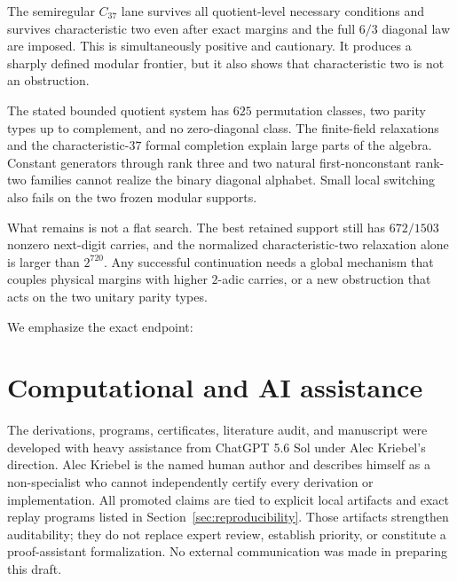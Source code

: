 \documentclass[11pt]{article}
\theoremstyle{definition}
\begin{document}
The semiregular \(C_{37}\) lane survives all quotient-level necessary
conditions and survives characteristic two even after exact margins and
the full \(6/3\) diagonal law are imposed.  This is simultaneously
positive and cautionary.  It produces a sharply defined modular frontier,
but it also shows that characteristic two is not an obstruction.

The stated bounded quotient system has \(625\) permutation classes, two
parity types up to complement, and no zero-diagonal class.  The finite-field
relaxations and the characteristic-\(37\) formal completion explain large
parts of the algebra.  Constant generators through rank three and two
natural first-nonconstant rank-two families cannot realize the binary
diagonal alphabet.  Small local switching also fails on the two frozen
modular supports.

What remains is not a flat search.  The best retained support still has
\(672/1503\) nonzero next-digit carries, and the normalized
characteristic-two relaxation alone is larger than \(2^{720}\).
Any successful continuation needs a global mechanism that couples
physical margins with higher \(2\)-adic carries, or a new obstruction that
acts on the two unitary parity types.

We emphasize the exact endpoint:
\begin{center}
\end{center}

\section*{Computational and AI assistance}

The derivations, programs, certificates, literature audit, and manuscript
were developed with heavy assistance from ChatGPT 5.6 Sol under Alec
Kriebel's direction.  Alec Kriebel is the named human author and describes
himself as a non-specialist who cannot independently certify every
derivation or implementation.  All promoted claims are tied to explicit
local artifacts and exact replay programs listed in
Section~\ref{sec:reproducibility}.  Those artifacts strengthen
auditability; they do not replace expert review, establish priority, or
constitute a proof-assistant formalization.  No external communication was
made in preparing this draft.
\end{document}
